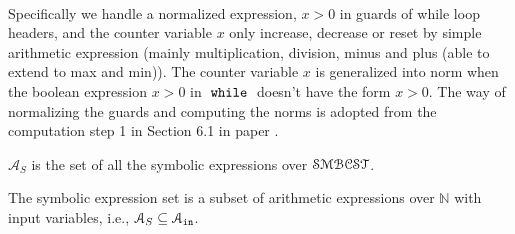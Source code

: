  \\
Specifically 
we handle a 
normalized expression, $x > 0$
in guards of while loop headers, and 
the counter variable $x$ only increase, decrease or reset by 
simple arithmetic expression (mainly multiplication, division, minus and plus (able to extend to max and min)). 
The counter variable $x$ is generalized into norm when the boolean expression $x > 0$
in $\;\mathtt{while}\;$ doesn't have the form $x > 0$.
The way of normalizing the guards and computing the norms is adopted from the computation step 1 in Section 6.1 in paper \cite{sinn2017complexity}. 
\begin{defn}
  $\mathcal{A}_{S}$ is the set of all the symbolic expressions 
over $\mathcal{SMBCST}$.
\end{defn}
The symbolic expression set is a subset of arithmetic expressions over $\mathbb{N}$ with input variables, 
i.e., $\mathcal{A}_{S} \subseteq \mathcal{A}_{\mathtt{in}}$.
